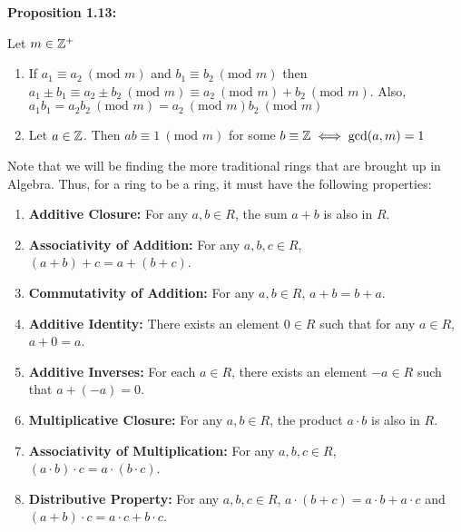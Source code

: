 \hypertarget{prop 1.13}{\textbf{Proposition 1.13:}} Let $m \in \mathbb{Z}^+$
\begin{enumerate}
    \item If $a_1 \equiv a_2 \ (\text{mod } m)$ and $b_1 \equiv b_2 \ (\text{mod } m)$ then $a_1 \pm b_1 \equiv a_2 \pm b_2 \ (\text{mod } m) \equiv a_2\ (\text{mod } m) + b_2\ (\text{mod } m)$. Also, $a_1b_1 = a_2b_2\ (\text{mod } m)=a_2\ (\text{mod } m) b_2\ (\text{mod } m)$
    \item Let $a \in \mathbb{Z}$. Then $ab \equiv 1\ (\text{mod } m)$ for some $b\equiv \mathbb{Z} \iff \gcd(a,m)=1$
\end{enumerate}


Note that we will be finding the more traditional rings that are brought up in Algebra. Thus, for a ring to be a ring, it must have the following properties: \begin{enumerate}[label=\arabic*.]
    \item \textbf{Additive Closure:} For any \( a, b \in R \), the sum \( a + b \) is also in \( R \).
    \item \textbf{Associativity of Addition:} For any \( a, b, c \in R \), \( (a + b) + c = a + (b + c) \).
    \item \textbf{Commutativity of Addition:} For any \( a, b \in R \), \( a + b = b + a \).
    \item \textbf{Additive Identity:} There exists an element \( 0 \in R \) such that for any \( a \in R \), \( a + 0 = a \).
    \item \textbf{Additive Inverses:} For each \( a \in R \), there exists an element \( -a \in R \) such that \( a + (-a) = 0 \).
    \item \textbf{Multiplicative Closure:} For any \( a, b \in R \), the product \( a \cdot b \) is also in \( R \).
    \item \textbf{Associativity of Multiplication:} For any \( a, b, c \in R \), \( (a \cdot b) \cdot c = a \cdot (b \cdot c) \).
    \item \textbf{Distributive Property:} For any \( a, b, c \in R \), \( a \cdot (b + c) = a \cdot b + a \cdot c \) and \( (a + b) \cdot c = a \cdot c + b \cdot c \).
\end{enumerate}

